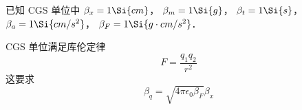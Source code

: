 
已知 CGS 单位中 $\beta_x = 1\Si{cm}$， $\beta_m = 1\Si{g}$， $\beta_t = 1\Si{s}$， $\beta_a = 1\Si{cm/s^2}$， $\beta_F = 1\Si{g \cdot cm/s^2}$．

CGS 单位满足库伦定律
\begin{equation}
F = \frac{q_1 q_2}{r^2}
\end{equation}
这要求
\begin{equation}
\beta_q = \sqrt{4\pi\epsilon_0\beta_F} \beta_x
\end{equation}
